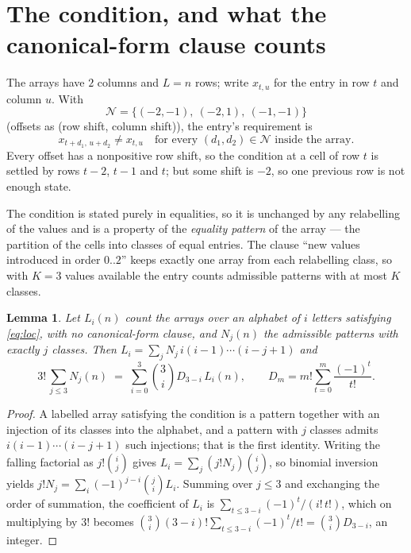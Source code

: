 \documentclass[11pt,a4paper]{article}
\theoremstyle{plain}
\newtheorem{lemma}[theorem]{Lemma}
\theoremstyle{definition}
\begin{document}
\section{The condition, and what the canonical-form clause counts}

The arrays have $2$ columns and $L=n$ rows; write $x_{t,u}$ for the entry in
row $t$ and column $u$. With
\[
\mathcal N=\{(-2,-1),\ (-2,1),\ (-1,-1)\}
\]
(offsets as (row shift, column shift)), the entry's requirement is
\begin{equation}\label{eq:loc}
x_{t+d_1,\,u+d_2}\ne x_{t,u}\quad\text{for every }(d_1,d_2)\in\mathcal N\text{ inside the array}.
\end{equation}
Every offset has a nonpositive row shift, so the condition at a cell of row $t$ is
settled by rows $t-2$, $t-1$ and $t$; but some shift is $-2$, so one previous row is not
enough state.

The condition is stated purely in equalities, so it is unchanged by any relabelling of the
values and is a property of the \emph{equality pattern} of the array --- the partition of
the cells into classes of equal entries. The clause ``new values introduced in order
$0..2$'' keeps exactly one array from each relabelling class, so with $K=3$ values
available the entry counts admissible patterns with at most $K$ classes.

\begin{lemma}\label{lem:inv}
Let $L_i(n)$ count the arrays over an alphabet of $i$ letters satisfying \eqref{eq:loc},
with no canonical-form clause, and $N_j(n)$ the admissible patterns with exactly $j$ classes.
Then $L_i=\sum_j N_j\,i(i-1)\cdots(i-j+1)$ and
\[
3!\,\sum_{j\le 3}N_j(n)\;=\;\sum_{i=0}^{3}\binom{3}{i}D_{3-i}\,L_i(n),
\qquad D_m=m!\sum_{t=0}^{m}\frac{(-1)^t}{t!} .
\]
\end{lemma}

\begin{proof}
A labelled array satisfying the condition is a pattern together with an injection of its
classes into the alphabet, and a pattern with $j$ classes admits $i(i-1)\cdots(i-j+1)$ such
injections; that is the first identity. Writing the falling factorial as $j!\binom{i}{j}$
gives $L_i=\sum_j(j!N_j)\binom{i}{j}$, so binomial inversion yields
$j!N_j=\sum_i(-1)^{j-i}\binom{j}{i}L_i$. Summing over $j\le3$ and exchanging the
order of summation, the coefficient of $L_i$ is $\sum_{t\le3-i}(-1)^t/(i!\,t!)$, which on
multiplying by $3!$ becomes
$\binom{3}{i}(3-i)!\sum_{t\le3-i}(-1)^t/t!=\binom{3}{i}D_{3-i}$, an
integer.
\end{proof}
\end{document}
